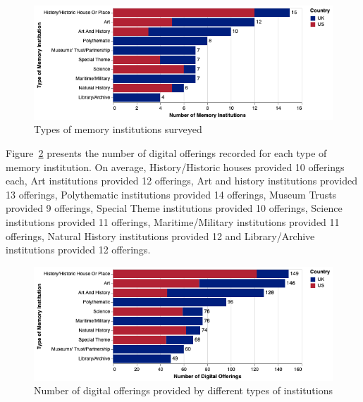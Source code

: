 \documentclass{egpubl}
\begin{document}
\begin{figure}[h]
  \centering
  \includegraphics[width=\linewidth]{images/museumtype.png}
  \caption{\label{fig:MType}
           Types of memory institutions surveyed}
\end{figure}

Figure~\ref{fig:typeofferings} presents the number of digital offerings recorded for each type of memory institution. On average, History/Historic houses provided 10 offerings each, Art institutions provided 12 offerings, Art and history institutions provided 13 offerings, Polythematic institutions provided 14 offerings, Museum Trusts provided 9 offerings, Special Theme institutions provided 10 offerings, Science institutions provided 11 offerings, Maritime/Military institutions provided 11 offerings, Natural History institutions provided 12 and Library/Archive institutions provided 12 offerings. 

\begin{figure}[h]
  \centering
  \includegraphics[width=\linewidth]{images/typesoffering.png}
  \caption{\label{fig:typeofferings}
           Number of digital offerings provided by different types of institutions}
\end{figure}
\end{document}
